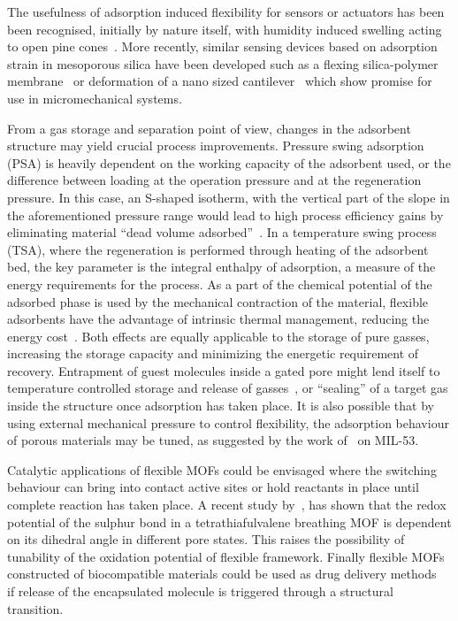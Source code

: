 The usefulness of adsorption induced flexibility for sensors or
actuators has been been recognised, initially by nature itself,
with humidity induced swelling acting to open pine 
cones~\cite{dawsonHowPineCones1997}.
More recently, similar sensing devices based on adsorption strain 
in mesoporous silica have been 
developed such as a flexing silica-polymer 
membrane~\cite{boudotConvertingWaterAdsorption2016} or 
deformation of a nano sized 
cantilever~\cite{ganserCantileverBendingBased2016} 
which show promise for use in micromechanical systems. 

From a gas storage and separation point of view, changes in the
adsorbent structure may yield crucial process improvements. 
Pressure swing adsorption (PSA) is heavily
dependent on the working capacity of the adsorbent used, or the
difference between loading at the operation pressure and at the 
regeneration pressure. In this case, an S-shaped isotherm, with 
the vertical part of the slope in the aforementioned pressure 
range would lead to high process efficiency gains by eliminating material
``dead volume adsorbed''~\cite{schneemannFlexibleMetalOrganic2014}. 
In a temperature swing process (TSA), where 
the regeneration is performed through heating of the adsorbent 
bed, the key parameter is the integral enthalpy of adsorption, a measure 
of the energy requirements for the process. As a part of the chemical 
potential of the adsorbed phase is used by the mechanical contraction
of the material, flexible adsorbents have the advantage of
intrinsic thermal management, reducing the energy 
cost~\cite{masonMethaneStorageFlexible2015}.
Both effects are equally applicable to the storage of pure 
gasses, increasing the storage capacity and minimizing the energetic
requirement of recovery. Entrapment of guest molecules inside 
a gated pore might lend itself to temperature controlled storage and 
release of gasses~\cite{bunzenAchievingLargeVolumetric2018}, or
``sealing'' of a target gas inside the structure once adsorption
has taken place.
It is also possible that by using external mechanical pressure to
control flexibility, the adsorption behaviour of porous materials
may be tuned, as suggested by the work 
of~\citet{chanutUsingExternalFactors2016} on MIL-53. 

Catalytic applications of flexible MOFs could be envisaged where 
the switching behaviour can bring into contact active sites or 
hold reactants in place until complete reaction has taken place.
A recent study by~\citet{soutoBreathingDependentRedoxActivity2018},
has shown that the redox potential of the sulphur bond in a 
tetrathiafulvalene breathing MOF is dependent on its dihedral 
angle in different pore states. This raises the possibility of 
tunability of the oxidation potential of flexible framework.
Finally flexible MOFs constructed of biocompatible materials 
could be used as drug delivery 
methods~\cite{mckinlayNitricOxideAdsorption2013, %
horcajadaFlexiblePorousMetalOrganic2008} if release 
of the encapsulated molecule is triggered through a 
structural transition.


